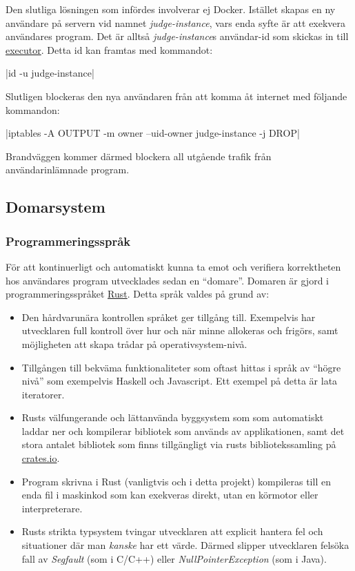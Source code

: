 \documentclass{article}
\begin{document}
Den slutliga lösningen som infördes involverar ej Docker. Istället skapas
en ny användare på servern vid namnet \textit{judge-instance}, vars enda
syfte är att exekvera användares program. Det är alltså \textit{judge-instance}s
användar-id som skickas in till \hyperlink{executor}{executor}.
Detta id kan framtas med kommandot:

|id -u judge-instance|

Slutligen blockeras den nya användaren från att komma åt internet med följande
kommandon:

|iptables -A OUTPUT -m owner --uid-owner judge-instance -j DROP|

Brandväggen kommer därmed blockera all utgående trafik från användarinlämnade
program.

\subsection{Domarsystem}

\subsubsection{Programmeringsspråk}

För att kontinuerligt och automatiskt kunna ta emot och verifiera korrektheten
hos användares program utvecklades sedan en ``domare''. Domaren är gjord i
programmeringsspråket \href{https://rust-lang.org}{Rust}. Detta språk valdes på
grund av:

\begin{itemize}
	\item Den hårdvarunära kontrollen språket ger tillgång till. Exempelvis har
		utvecklaren full kontroll över hur och när minne allokeras och frigörs,
		samt möjligheten att skapa trådar på operativsystem-nivå.
	\item Tillgången till bekväma funktionaliteter som oftast hittas i språk av
		``högre nivå'' som exempelvis Haskell och Javascript. Ett exempel på detta
		är lata iteratorer.
	\item Rusts välfungerande och lättanvända byggsystem som som automatiskt
		laddar ner och kompilerar bibliotek som används av applikationen, samt
		det stora antalet bibliotek som finns tillgängligt via rusts
		bibliotekssamling på \href{https://crates.io}{crates.io}.
	\item Program skrivna i Rust (vanligtvis och i detta projekt) kompileras
		till en enda fil i maskinkod som kan exekveras direkt, utan en körmotor
		eller interpreterare.
	\item Rusts strikta typsystem tvingar utvecklaren att explicit hantera fel
		och situationer där man \textit{kanske} har ett värde. Därmed slipper
		utvecklaren felsöka fall av \textit{Segfault} (som i C/C++) eller
		\textit{NullPointerException} (som i Java).
\end{itemize}
\end{document}

